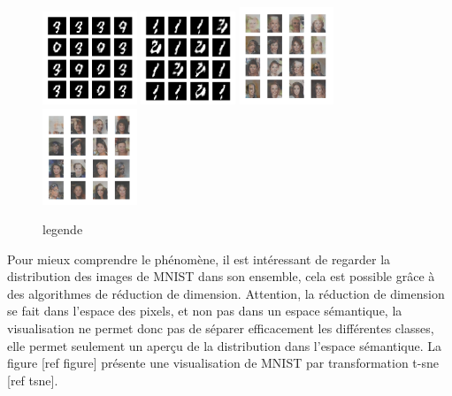 \begin{figure}[!h]
\centering
\includegraphics[width=80pt]{"images/collapseA_1"}
\includegraphics[width=80pt]{"images/collapseA_2"}
\includegraphics[width=80pt]{"images/collapseB_1"}
\includegraphics[width=80pt]{"images/collapseB_2"}
\caption{legende}
\end{figure}




Pour mieux comprendre le phénomène, il est intéressant de regarder la distribution des images de MNIST dans son ensemble, cela est possible grâce à des algorithmes de réduction de dimension. Attention, la réduction de dimension se fait dans l'espace des pixels, et non pas dans un espace sémantique, la visualisation ne permet donc pas de séparer efficacement les différentes classes, elle permet seulement un aperçu de la distribution dans l'espace sémantique. La figure [ref figure] présente une visualisation de MNIST par transformation t-sne [ref tsne].

